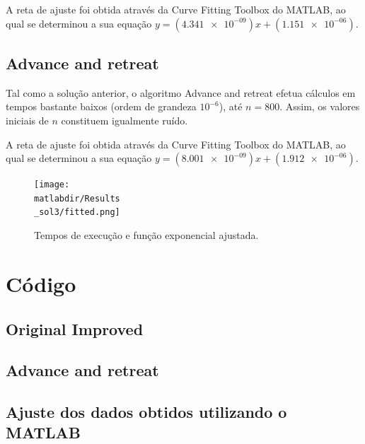 \documentclass[portuguese,11pt,a4paper,titlepage]{article}
\newcommand{\srcdir}{..}
\newcommand{\matlabdir}{"../MATLAB fittings"}
\begin{document}
A reta de ajuste foi obtida através da Curve Fitting Toolbox do MATLAB, ao qual se determinou
a sua equação \begin{math}y=(\num{4.341e-09})x+(\num{1.151e-06})\end{math}.
\pagebreak
\subsection{Advance and retreat}
Tal como a solução anterior, o algoritmo Advance and retreat efetua cálculos em tempos bastante baixos
(ordem de grandeza \begin{math}10^{-6}\end{math}), até \begin{math}n = 800\end{math}.
Assim, os valores iniciais de \begin{math}n\end{math} constituem igualmente ruído.

A reta de ajuste foi obtida através da Curve Fitting Toolbox do MATLAB, ao qual se determinou
a sua equação \begin{math}y=(\num{8.001e-09})x+(\num{1.912e-06})\end{math}.
\begin{figure}[h]
	\centering
	\texttt{[image: \\matlabdir/Results\\\_sol3/fitted.png]}
	\caption{Tempos de execução e função exponencial ajustada.}
	\label{fig:sol2}
\end{figure}
\pagebreak

\section{Código}
\subsection{Original Improved}

\pagebreak
\subsection{Advance and retreat}

\subsection{Ajuste dos dados obtidos utilizando o MATLAB}

\end{document}
